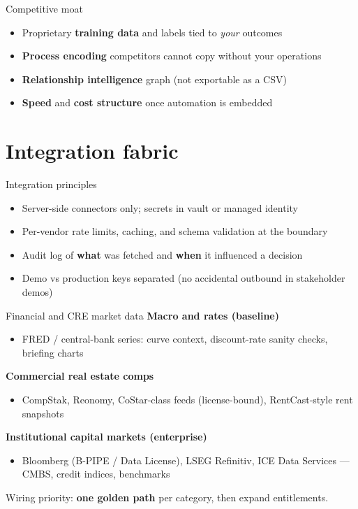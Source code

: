\documentclass[aspectratio=169,11pt]{beamer}
\begin{document}
\begin{frame}{Competitive moat}
  \begin{itemize}
    \item Proprietary \textbf{training data} and labels tied to \textit{your} outcomes
    \item \textbf{Process encoding} competitors cannot copy without your operations
    \item \textbf{Relationship intelligence} graph (not exportable as a CSV)
    \item \textbf{Speed} and \textbf{cost structure} once automation is embedded
  \end{itemize}
\end{frame}

\section{Integration fabric}

\begin{frame}{Integration principles}
  \small
  \begin{itemize}
    \item Server-side connectors only; secrets in vault or managed identity
    \item Per-vendor rate limits, caching, and schema validation at the boundary
    \item Audit log of \textbf{what} was fetched and \textbf{when} it influenced a decision
    \item Demo vs production keys separated (no accidental outbound in stakeholder demos)
  \end{itemize}
\end{frame}

\begin{frame}{Financial and CRE market data}
  \small
  \textbf{Macro and rates (baseline)}
  \begin{itemize}
    \item FRED / central-bank series: curve context, discount-rate sanity checks, briefing charts
  \end{itemize}
  \textbf{Commercial real estate comps}
  \begin{itemize}
    \item CompStak, Reonomy, CoStar-class feeds (license-bound), RentCast-style rent snapshots
  \end{itemize}
  \textbf{Institutional capital markets (enterprise)}
  \begin{itemize}
    \item Bloomberg (B-PIPE / Data License), LSEG Refinitiv, ICE Data Services --- CMBS, credit indices, benchmarks
  \end{itemize}
  Wiring priority: \textbf{one golden path} per category, then expand entitlements.
\end{frame}
\end{document}
